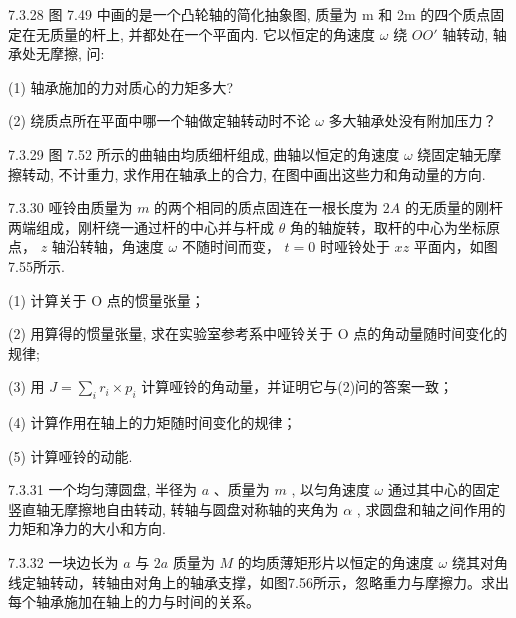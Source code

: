 \begin{problem}{7.3.28}
图 7.49 中画的是一个凸轮轴的简化抽象图, 质量为 m 和 2m 的四个质点固定在无质量的杆上, 并都处在一个平面内. 它以恒定的角速度 $\omega$ 绕 $OO'$ 轴转动, 轴承处无摩擦, 问:

(1) 轴承施加的力对质心的力矩多大?

(2) 绕质点所在平面中哪一个轴做定轴转动时不论 $\omega$ 多大轴承处没有附加压力？
\begin{center}

\end{center}
\end{problem}
\clearpage


\begin{problem}{7.3.29}
图 7.52 所示的曲轴由均质细杆组成, 曲轴以恒定的角速度 $\omega$ 绕固定轴无摩擦转动, 不计重力, 求作用在轴承上的合力, 在图中画出这些力和角动量的方向.
\begin{center}

\end{center}
\end{problem}
\clearpage


\begin{problem}{7.3.30}
哑铃由质量为 $m$ 的两个相同的质点固连在一根长度为 $2A$ 的无质量的刚杆两端组成，刚杆绕一通过杆的中心并与杆成 $\theta$ 角的轴旋转，取杆的中心为坐标原点， $z$ 轴沿转轴，角速度 $\omega$ 不随时间而变， $t = 0$ 时哑铃处于 $xz$ 平面内，如图7.55所示.

(1) 计算关于 O 点的惯量张量；

(2) 用算得的惯量张量, 求在实验室参考系中哑铃关于 O 点的角动量随时间变化的规律;

(3) 用 $J = \sum_{i} r_{i} \times p_{i}$ 计算哑铃的角动量，并证明它与(2)问的答案一致；

(4) 计算作用在轴上的力矩随时间变化的规律；

(5) 计算哑铃的动能.
\begin{center}

\end{center}
\end{problem}
\clearpage


\begin{problem}{7.3.31}
一个均匀薄圆盘, 半径为 $a$ 、质量为 $m$ , 以匀角速度 $\omega$ 通过其中心的固定竖直轴无摩擦地自由转动, 转轴与圆盘对称轴的夹角为 $\alpha$ , 求圆盘和轴之间作用的力矩和净力的大小和方向.
\end{problem}
\clearpage


\begin{problem}{7.3.32}
一块边长为 $a$ 与 $2a$ 质量为 $M$ 的均质薄矩形片以恒定的角速度 $\omega$ 绕其对角线定轴转动，转轴由对角上的轴承支撑，如图7.56所示，忽略重力与摩擦力。求出每个轴承施加在轴上的力与时间的关系。
\begin{center}

\end{center}
\begin{center}

\end{center}
\end{problem}
\clearpage


